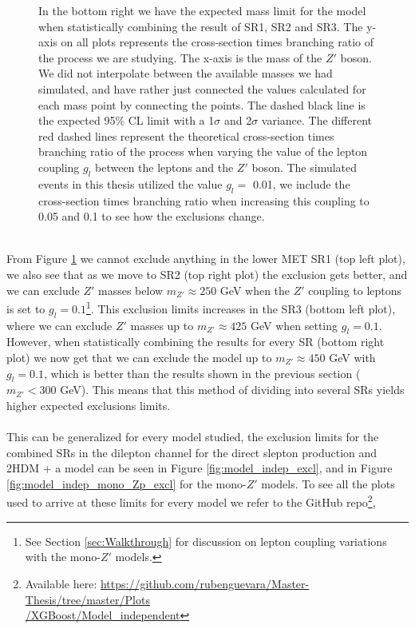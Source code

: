 \documentclass[12pt, a4paper]{book}
\begin{document}
\begin{figure}[!ht]
{   In the bottom right we have the expected mass limit for the model when statistically combining the result of SR1, SR2 and SR3. 
   The y-axis on all plots represents the cross-section times branching ratio of the process we are studying. The x-axis is the mass of the $Z'$ boson. We did not interpolate between the available masses we had simulated, 
   and have rather just connected the values calculated for each mass point by connecting the points. The dashed black line is the expected 95\% CL limit with a 1$\sigma$ and 2$\sigma$ variance. 
   The different red dashed lines represent the theoretical cross-section times branching ratio of the process when varying the value of the lepton coupling $g_l$ between the leptons and the $Z'$ boson. The simulated events in this thesis utilized the value $g_l=$ 0.01, we include the cross-section times branching ratio when increasing this coupling to 0.05 and 0.1 to see how the exclusions change. }\label{fig:DH_HDS_me_SRS}
\end{figure} 
\\From Figure \ref{fig:DH_HDS_me_SRS} we cannot exclude anything in the lower MET SR1 (top left plot), we also see that as we move to SR2 (top right plot) the exclusion gets better, and we can exclude $Z'$ masses below $m_{Z'}\approx250$ GeV when the $Z'$ coupling to leptons is set to $g_l=0.1$\footnote{See Section \ref{sec:Walkthrough} for discussion on lepton coupling variations with the mono-$Z'$ models.}. 
This exclusion limits increases in the SR3 (bottom left plot), where we can exclude $Z'$ masses up to $m_{Z'}\approx425$ GeV when setting $g_l=0.1$. However, when statistically combining the results for every SR (bottom right plot) we now get that we can exclude the model up to $m_{Z'}\approx450$ GeV with $g_l=0.1$,
which is better than the results shown in the previous section ($m_{Z'}<300$ GeV). This means that this method of dividing into several SRs yields higher expected exclusions limits.\\
\\ This can be generalized for every model studied, the exclusion limits for the combined SRs in the dilepton channel for the direct slepton production and 2HDM + a model can be seen in Figure \ref{fig:model_indep_excl}, and in Figure \ref{fig:model_indep_mono_Zp_excl} for the mono-$Z'$ models.
To see all the plots used to arrive at these limits for every model we refer to the GitHub repo\footnote{Available here: \href{https://github.com/rubenguevara/Master-Thesis/tree/master/Plots/XGBoost/Model_independent}{https://github.com/rubenguevara/Master-Thesis/tree/master/Plots\\/XGBoost/Model\_independent}}, 
\end{document}
